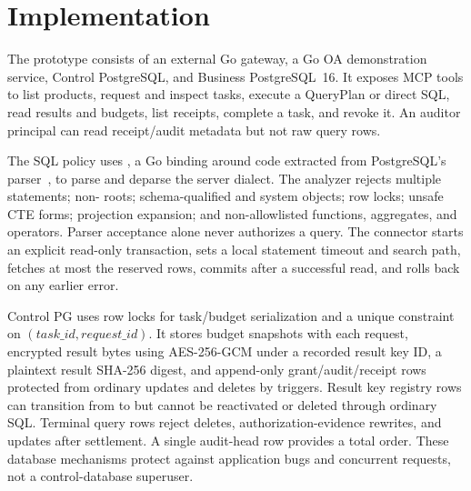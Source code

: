 \documentclass[10pt,journal,compsoc]{IEEEtran}
\newcommand{\code}[1]{\texttt{\detokenize{#1}}}
\begin{document}


\section{Implementation}
\label{sec:implementation}

The prototype consists of an external Go gateway, a Go OA demonstration
service, Control PostgreSQL, and Business PostgreSQL~16.  It exposes MCP tools
to list products, request and inspect tasks, execute a QueryPlan or direct SQL,
read results and budgets, list receipts, complete a task, and revoke it.  An
auditor principal can read receipt/audit metadata but not raw query rows.

The SQL policy uses \code{pg\_query\_go/v6}, a Go binding around code extracted
from PostgreSQL's parser~\cite{libpgquery}, to parse and deparse the server
dialect.  The analyzer rejects multiple statements; non-\code{SELECT} roots;
schema-qualified and system objects; row locks; unsafe CTE forms; projection
expansion; and non-allowlisted functions, aggregates, and operators.  Parser
acceptance alone never authorizes a query.  The connector starts an explicit
read-only transaction, sets a local statement timeout and search path, fetches
at most the reserved rows, commits after a successful read, and rolls back on
any earlier error.

Control PG uses row locks for task/budget serialization and a unique constraint
on $(task\_id,request\_id)$.  It stores budget snapshots with each request,
encrypted result bytes using AES-256-GCM under a recorded result key ID, a
plaintext result SHA-256 digest, and append-only grant/audit/receipt rows
protected from ordinary updates and deletes by triggers.  Result key registry
rows can transition from \code{ACTIVE} to \code{ERASED} but cannot be
reactivated or deleted through ordinary SQL.  Terminal query rows reject
deletes, authorization-evidence rewrites, and updates after settlement.  A
single audit-head row provides a total order.  These database
mechanisms protect against application bugs and concurrent requests, not a
control-database superuser.
\end{document}
